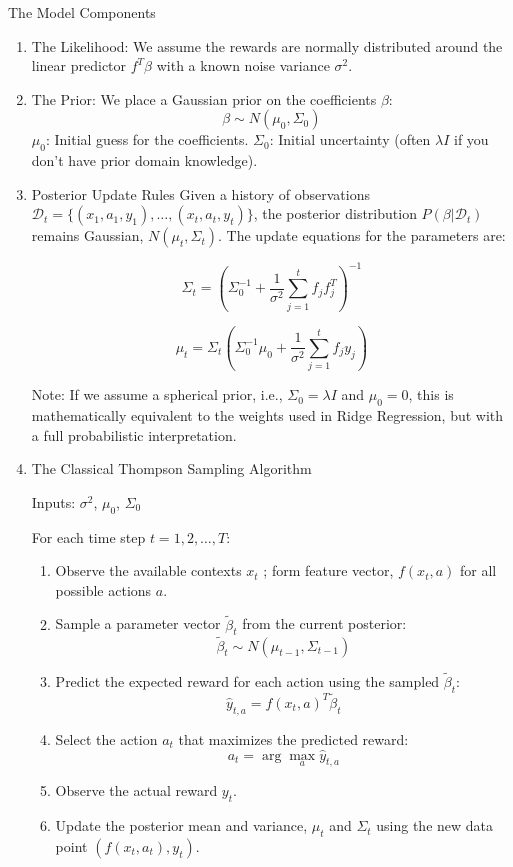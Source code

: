 \documentclass{article}
\begin{document}
\noindent The Model Components
\begin{enumerate}
    \item The Likelihood: We assume the rewards are normally distributed around the linear predictor $f^T \beta$ with a known noise variance $\sigma^2$.
    \item The Prior: We place a Gaussian prior on the coefficients $\beta$:
$$\beta \sim N(\mu_0, \Sigma_0)$$
$\mu_0$: Initial guess for the coefficients.
$\Sigma_0$: Initial uncertainty (often $\lambda I$ if you don't have prior domain knowledge).  
\item Posterior Update Rules
Given a history of observations $\mathcal{D}_t = \{(x_1, a_1, y_1), \dots, (x_t, a_t, y_t)\}$, the posterior distribution $P(\beta | \mathcal{D}_t)$ remains Gaussian, $N(\mu_t, \Sigma_t)$.
The update equations for the parameters are:

$$\Sigma_t = (\Sigma_0^{-1} + \frac{1}{\sigma^2} \sum_{j=1}^t f_j f_j^T)^{-1}$$

$$\mu_t = \Sigma_t (\Sigma_0^{-1} \mu_0 + \frac{1}{\sigma^2} \sum_{j=1}^t f_j y_j)$$

Note: If we assume a spherical prior, i.e., $\Sigma_0 = \lambda I$ and $\mu_0 = 0$, this is mathematically equivalent to the weights used in Ridge Regression, but with a full probabilistic interpretation.
\item The Classical Thompson Sampling Algorithm

\noindent Inputs:  $\sigma^2$, $\mu_0$, $\Sigma_0$

\noindent For each time step $t = 1, 2, \dots, T$:
\begin{enumerate}
    \item Observe the available contexts $x_{t}$ ; form feature vector, $f(x_t,a)$ for all possible actions $a$.
    \item Sample a parameter vector $\tilde{\beta}_t$ from the current posterior:
$$\tilde{\beta}_t \sim N(\mu_{t-1}, \Sigma_{t-1})$$
\item Predict the expected reward for each action using the sampled $\tilde{\beta}_t$:
$$\hat{y}_{t, a} = f({x_t, a})^T \tilde{\beta}_t$$
\item Select the action $a_t$ that maximizes the predicted reward:
$$a_t = \arg\max_a \hat{y}_{t, a}$$
\item Observe the actual reward $y_t$.
\item Update the posterior mean and variance, $\mu_t$ and $\Sigma_t$ using the new data point $(f({x_t, a_t}), y_t)$.
\end{enumerate}
\end{enumerate}
\end{document}
